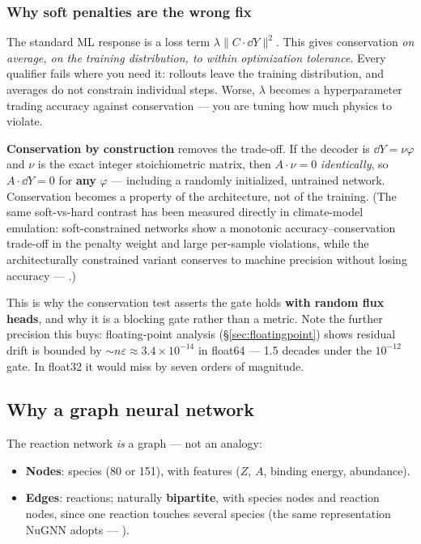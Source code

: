 \subsubsection{Why soft penalties are the wrong fix}
\label{sec:softpenalties}

The standard ML response is a loss term $\lambda\|C\cdot \dd Y\|^2$. This gives
conservation \emph{on average, on the training distribution, to within
optimization tolerance}. Every qualifier fails where you need it: rollouts leave
the training distribution, and averages do not constrain individual steps.
Worse, $\lambda$ becomes a hyperparameter trading accuracy against conservation
--- you are tuning how much physics to violate.

\textbf{Conservation by construction} removes the trade-off. If the decoder is
$\dd Y = \nu\varphi$ and $\nu$ is the exact integer stoichiometric matrix, then
$A\cdot\nu = 0$ \emph{identically}, so $A\cdot \dd Y = 0$ for \textbf{any}
$\varphi$ --- including a randomly initialized, untrained network. Conservation
becomes a property of the architecture, not of the training. (The same
soft-vs-hard contrast has been measured directly in climate-model emulation:
soft-constrained networks show a monotonic accuracy--conservation trade-off in
the penalty weight and large per-sample violations, while the architecturally
constrained variant conserves to machine precision without losing accuracy ---
\citealt{beucler2021}.)

This is why the conservation test asserts the gate holds \textbf{with random
flux heads}, and why it is a blocking gate rather than a metric. Note the
further precision this buys: floating-point analysis (\S\ref{sec:floatingpoint})
shows residual drift is bounded by ${\sim}n\varepsilon \approx
3.4\times10^{-14}$ in float64 --- 1.5 decades under the $10^{-12}$ gate. In
float32 it would miss by seven orders of magnitude.

\subsection{Why a graph neural network}
\label{sec:whygnn}

The reaction network \emph{is} a graph --- not an analogy:

\begin{itemize}
\item \textbf{Nodes}: species (80 or 151), with features ($Z$, $A$, binding
      energy, abundance).
\item \textbf{Edges}: reactions; naturally \textbf{bipartite}, with species
      nodes and reaction nodes, since one reaction touches several species (the
      same representation NuGNN adopts --- \citealt{kim2026}).
\end{itemize}

